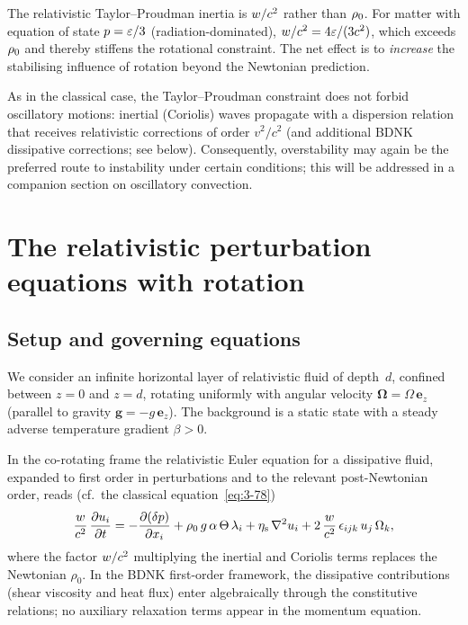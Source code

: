 \begin{relcorrection}
The relativistic Taylor--Proudman inertia is $w/c^2$ rather than
$\rho_0$.  For matter with equation of state $p = \varepsilon/3$
(radiation-dominated), $w/c^2 = 4\varepsilon/(3c^2)$, which
exceeds $\rho_0$ and thereby stiffens the rotational constraint.
The net effect is to \emph{increase} the stabilising influence of
rotation beyond the Newtonian prediction.
\end{relcorrection}

As in the classical case, the Taylor--Proudman constraint does not
forbid oscillatory motions: inertial (Coriolis) waves propagate with a
dispersion relation that receives relativistic corrections of order
$v^2/c^2$ (and additional BDNK dissipative corrections; see
below).  Consequently, overstability may again be the preferred route to
instability under certain conditions; this will be addressed in a
companion section on oscillatory convection.

\section{The relativistic perturbation equations with rotation}
\label{sec:rel-3-25}

\subsection*{Setup and governing equations}

We consider an infinite horizontal layer of relativistic fluid of
depth~$d$, confined between $z = 0$ and $z = d$, rotating uniformly
with angular velocity $\boldsymbol{\Omega} = \Omega\,\boldsymbol{e}_z$
(parallel to gravity $\mathbf{g} = -g\,\boldsymbol{e}_z$).  The background
is a static state with a steady adverse temperature gradient $\beta > 0$.

In the co-rotating frame the relativistic Euler equation for a
dissipative fluid, expanded to first order in perturbations and to
the relevant post-Newtonian order, reads (cf.\ the classical
equation~\eqref{eq:3-78})
\begin{equation}\label{eq:rel-3-78}
  \frac{w}{c^2}\,\frac{\partial u_i}{\partial t}
  = -\frac{\partial(\delta p)}{\partial x_i}
    + \rho_0\,g\,\alpha\,\Theta\,\lambda_i
    + \eta_{\mathrm{s}}\,\nabla^2 u_i
    + 2\,\frac{w}{c^2}\,\epsilon_{ijk}\,u_j\,\Omega_k,
\end{equation}
where the factor $w/c^2$ multiplying the inertial and
Coriolis terms replaces the Newtonian $\rho_0$.  In the BDNK
first-order framework, the dissipative contributions (shear viscosity
and heat flux) enter algebraically through the constitutive relations;
no auxiliary relaxation terms appear in the momentum equation.

